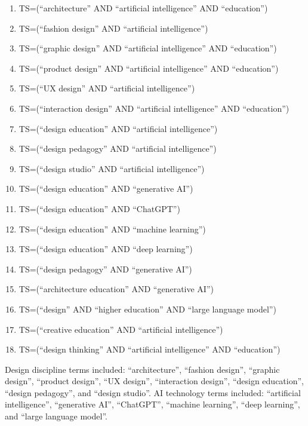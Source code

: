 \documentclass[ed]{acnsart}
\begin{document}
\begin{enumerate}[itemsep=0.2em]
	\item TS=(``architecture'' AND ``artificial intelligence'' AND ``education'')
	\item TS=(``fashion design'' AND ``artificial intelligence'')
	\item TS=(``graphic design'' AND ``artificial intelligence'' AND ``education'')
	\item TS=(``product design'' AND ``artificial intelligence'' AND ``education'')
	\item TS=(``UX design'' AND ``artificial intelligence'')
	\item TS=(``interaction design'' AND ``artificial intelligence'' AND ``education'')
	\item TS=(``design education'' AND ``artificial intelligence'')
	\item TS=(``design pedagogy'' AND ``artificial intelligence'')
	\item TS=(``design studio'' AND ``artificial intelligence'')
	\item TS=(``design education'' AND ``generative AI'')
	\item TS=(``design education'' AND ``ChatGPT'')
	\item TS=(``design education'' AND ``machine learning'')
	\item TS=(``design education'' AND ``deep learning'')
	\item TS=(``design pedagogy'' AND ``generative AI'')
	\item TS=(``architecture education'' AND ``generative AI'')
	\item TS=(``design'' AND ``higher education'' AND ``large language model'')
	\item TS=(``creative education'' AND ``artificial intelligence'')
	\item TS=(``design thinking'' AND ``artificial intelligence'' AND ``education'')
\end{enumerate}




Design discipline terms included: ``architecture'', ``fashion design'', ``graphic design'', ``product design'', ``UX design'', ``interaction design'', ``design education'', ``design pedagogy'', and ``design studio''. AI technology terms included: ``artificial intelligence'', ``generative AI'', ``ChatGPT'', ``machine learning'', ``deep learning'', and ``large language model''.
\end{document}
